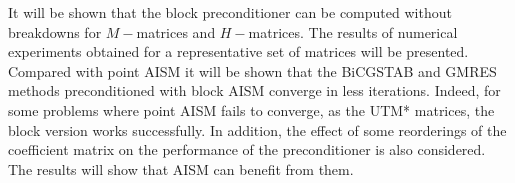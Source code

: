 \documentclass{report}
\begin{document}
It will be shown that the block preconditioner can be computed without breakdowns for
$M-$matrices and $H-$matrices.
The results of numerical experiments obtained for a representative set of
matrices will be presented. Compared with point AISM it will be shown
that the BiCGSTAB and GMRES methods preconditioned with block AISM
converge in less iterations. Indeed, for some problems where point AISM
fails to converge, as the UTM* matrices, the block version works
successfully. In addition, the effect of some reorderings of the
coefficient matrix on the performance of the preconditioner is also
considered. The results will show that AISM can benefit from them.
\end{document}
